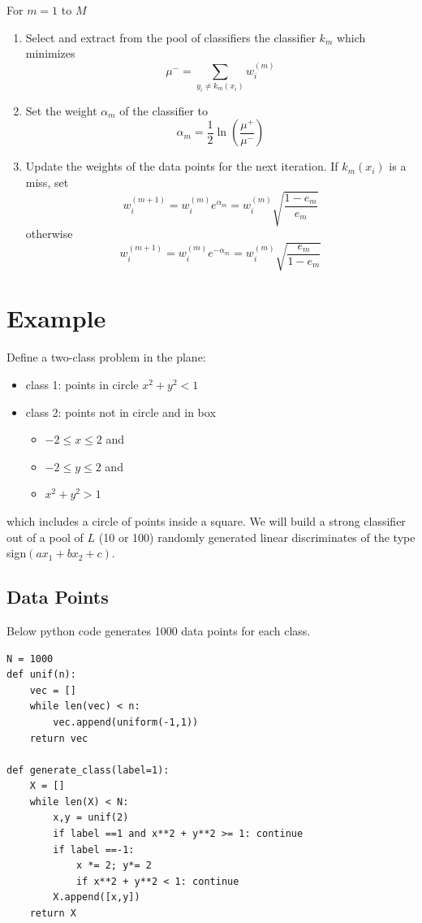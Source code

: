 \documentclass[]{article}  %
\begin{document}
For $m=1$ to $M$
\begin{enumerate}

\item Select and extract from the pool of classifiers the classifier $k_m$ which minimizes 
\[
\mu^- = \sum _{y_i\neq k_m(x_i)}w_i^{(m)}
\]
\item Set the weight $\alpha_m$ of the classifier to 
\[
\alpha_m = \frac{1}{2} \ln \left(\frac{\mu^+}{\mu^-}\right) 
\]

\item Update the weights of the data points for the next iteration. If $k_m(x_i)$ is a miss, set
\[
w_i^{(m+1)} = w_i^{(m)} e^{\alpha_m}=w_i^{(m)}\sqrt{\frac{1-e_m}{e_m}} 
\]
otherwise 
\[
w_i^{(m+1)} =w_i^{(m)} e^ {-\alpha_m}=w_i^{(m)}\sqrt{\frac{e_m}{1-e_m}}
\]
\end{enumerate}

\section{Example}

Define a two-class problem in the plane:
\begin{itemize}
\item class 1: points in circle $x^2+y^2 < 1$

\item class 2: points not in circle and in box 
\begin{itemize}
\item $-2\leq x \leq 2 $ and
\item $-2 \leq y \leq 2 $ and
\item$x^2 + y^2 > 1$ 
\end{itemize}
\end{itemize}

which includes a circle of points inside a square. We will build a strong classifier out of a pool of $L$ (10 or 100) randomly generated linear discriminates of the type sign$(ax_1+bx_2+c)$. 

\subsection{Data Points}

Below python code generates 1000 data points for each class.
\begin{verbatim}
N = 1000
def unif(n):
    vec = []
    while len(vec) < n:
        vec.append(uniform(-1,1))
    return vec

def generate_class(label=1):
    X = []
    while len(X) < N:
        x,y = unif(2)
        if label ==1 and x**2 + y**2 >= 1: continue
        if label ==-1:
            x *= 2; y*= 2
            if x**2 + y**2 < 1: continue
        X.append([x,y])
    return X
\end{verbatim}
\end{document}
